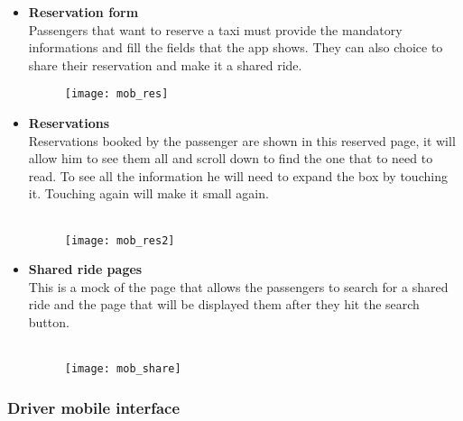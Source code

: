 \begin{itemize}
\item \textbf{Reservation form} \\Passengers that want to reserve a taxi must provide the mandatory informations and fill the fields that the app shows. They can also choice to share their reservation and make it a shared ride.
\\ 
\begin{figure}[h]
	\centering	
	\texttt{[image: mob\_res]}
\end{figure}
\newpage

\item \textbf{Reservations} \\Reservations booked by the passenger are shown in this reserved page, it will allow him to see them all and scroll down to find the one that to need to read. To see all the information he will need to expand the box by touching it. Touching again will make it small again. \\ \\
\begin{figure}[h]
	\centering	
	\texttt{[image: mob\_res2]}
\end{figure}
\newpage


\item \textbf{Shared ride pages} \\This is a mock of the page that allows the passengers to search for a shared ride and the page that will be displayed them after they hit the search button.\\ \\ 
\begin{figure}[h]
	\centering	
	\texttt{[image: mob\_share]}
\end{figure}
\newpage



\end{itemize}

\subsubsection{Driver mobile interface}

